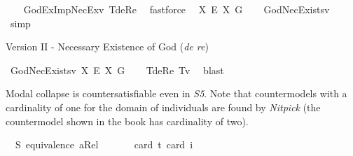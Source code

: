 \begin{isabellebody}
%
\ \ %
%
\isamarkupfalse%
\ GodExImpNecEx{\isacharunderscore}v{}\ T{}{\isacharunderscore}deRe\ \isamarkupfalse%
\ fastforce\ %
%
%
\isanewline
%
\isamarkupfalse%
\ {\isachardoublequoteopen}{\isasymlfloor}\isactrlbold {\isasymbox}{\isacharparenleft}{\isasymlambda}X{\isachardot}\ \isactrlbold {\isasymexists}\isactrlsup E\ X{\isacharparenright}\ \isactrlbold {\isasymdown}G{\isasymrfloor}{\isachardoublequoteclose}\isanewline
%
\ \ %
%
\isamarkupfalse%
\ GodNecExists{\isacharunderscore}v{}\ \isamarkupfalse%
\ simp\ %
%
%
%
%
\begin{isamarkuptext}%
Version II - Necessary Existence of God (\emph{de re})%
\end{isamarkuptext}\isamarkuptrue%
\isamarkupfalse%
\ GodNecExists{\isacharunderscore}v{}{\isacharcolon}\ {\isachardoublequoteopen}{\isasymlfloor}{\isacharparenleft}{\isasymlambda}X{\isachardot}\ \isactrlbold {\isasymbox}\isactrlbold {\isasymexists}\isactrlsup E\ X{\isacharparenright}\ \isactrlbold {\isasymdown}G{\isasymrfloor}{\isachardoublequoteclose}\isanewline
%
\ \ %
%
\isamarkupfalse%
\ T{}{\isacharunderscore}deRe\ T{}{\isacharunderscore}v{}\ \isamarkupfalse%
\ blast%
%
%
%
\isamarkuptrue%
%
\begin{isamarkuptext}%
Modal collapse is countersatisfiable even in \emph{S5}. Note that countermodels with a cardinality of one 
for the domain of individuals are found by \emph{Nitpick} (the countermodel shown in the book has cardinality of two).%
\end{isamarkuptext}\isamarkuptrue%
\isamarkupfalse%
\ \ S{}{\isacharcolon}\ {\isachardoublequoteopen}equivalence\ aRel{\isachardoublequoteclose}\ %
\isanewline
{}\isamarkupfalse%
\ {\isachardoublequoteopen}{\isasymlfloor}\isactrlbold {\isasymforall}{\isasymPhi}{\isachardot}{\isacharparenleft}{\isasymPhi}\ \isactrlbold {\isasymrightarrow}\ {\isacharparenleft}\isactrlbold {\isasymbox}\ {\isasymPhi}{\isacharparenright}{\isacharparenright}{\isasymrfloor}{\isachardoublequoteclose}\ \isamarkupfalse%
{\isacharbrackleft}card\ {\isacharprime}t{\isacharequal}{}{\isacharcomma}\ card\ i{\isacharequal}{}{\isacharbrackright}%
\ %
%
\isamarkupfalse%
\ %
%
%
%
%
%
%
%
%
%
%
\end{isabellebody}%
